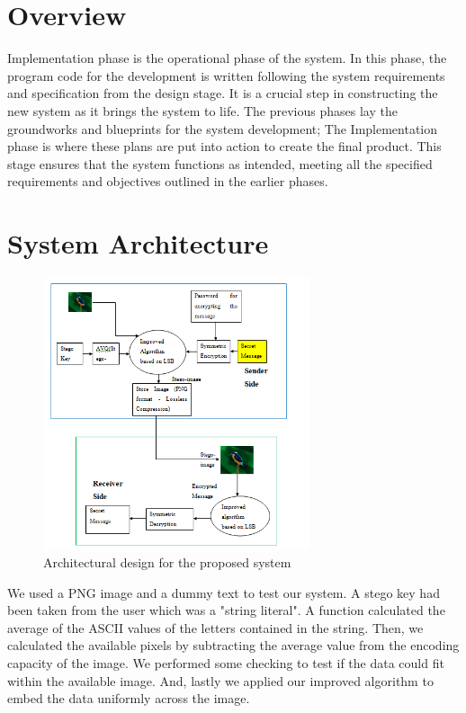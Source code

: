 \documentclass{report}
\begin{document}
\section{Overview}
Implementation phase is the operational phase of the system. In this phase, the program code for the development is written following the system requirements and specification from the design stage. It is a crucial step in constructing the new system as it brings the system to life. The previous phases lay the groundworks and blueprints for the system development; The Implementation phase is where these plans are put into action to create the final product. This stage ensures that the system functions as intended, meeting all the specified requirements and objectives outlined in the earlier phases.

\section{System Architecture}
\begin{figure}[htbp]
  \centering
  \includegraphics[width=0.7\textwidth, height=8cm]{Screenshot (359).png} 
  \caption{Architectural design for the proposed system }
  \label{fig:6}
\end{figure}
We used a PNG image and a dummy text to test our system. A stego key had been taken from the user which was a "string literal". A function calculated the average of the ASCII values of the letters contained in the string. Then, we calculated the available pixels by subtracting the average value from the encoding capacity of the image. We performed some checking to test if the data could fit within the available image. And, lastly we applied our improved algorithm to embed the data uniformly across the image. 
\end{document}
